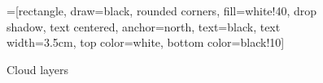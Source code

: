 \begin{figure}
  =[rectangle, draw=black, rounded corners, fill=white!40, drop shadow,
  text centered, anchor=north, text=black, text width=3.5cm, top color=white, bottom color=black!10]

  \begin{center}
  \end{center}
  \caption{Cloud layers}
  \label{fig:cloudlayers}
\end{figure}

